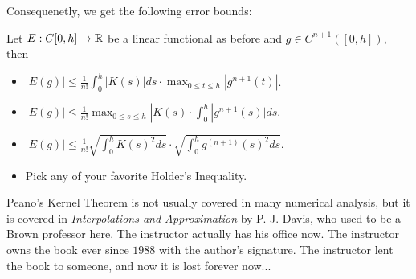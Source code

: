 \documentclass{article}
\begin{document}
Consequenetly, we get the following error bounds:
\begin{corollary}
Let $E: C[0, h] \to \mathbb{R}$ be a linear functional as before and $g \in C^{n+1}([0, h])$, then
\begin{itemize}
    \item $|E(g)| \leq \frac{1}{n!} \int_0^h |K(s)| ds \cdot \max_{0 \leq t \leq h} |g^{n+1}(t)|$.
    \item $|E(g)| \leq \frac{1}{n!} \max_{0 \leq s \leq h} |K(s) \cdot \int_0^h |g^{n+1}(s)| ds$.
    \item $|E(g)| \leq \frac{1}{n!} \sqrt{\int_0^h K(s)^2 ds} \cdot \sqrt{\int_0^h g^{(n+1)}(s)^2 ds}$.
    \item Pick any of your favorite Holder's Inequality.
\end{itemize}
\end{corollary}

\begin{remark}
Peano's Kernel Theorem is not usually covered in many numerical analysis, but it is covered in \textit{Interpolations and Approximation} by P. J. Davis, who used to be a Brown professor here. The instructor actually has his office now. The instructor owns the book ever since $1988$ with the author's signature. The instructor lent the book to someone, and now it is lost forever now...
\end{remark}
\end{document}
